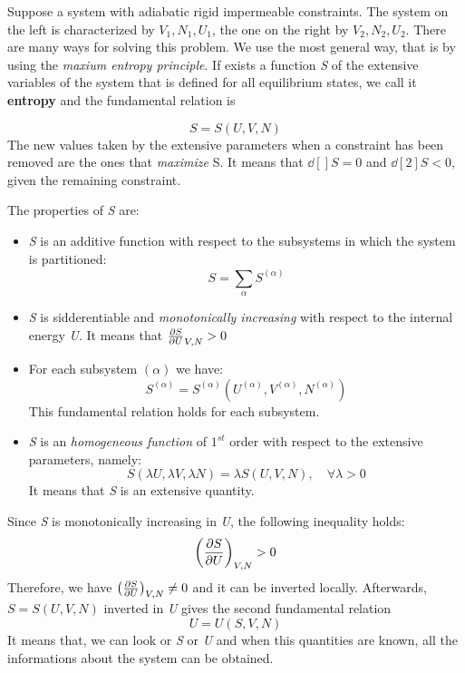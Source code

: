 \documentclass[../main/main.tex]{subfiles}
\begin{document}
Suppose a system with adiabatic rigid impermeable constraints. The system on the left is characterized by \( V_1,N_1,U_1 \), the one on the right by \( V_2,N_2,U_2 \). There are many ways for solving this problem.
We use the most general way, that is by using the \textit{maxium entropy principle}.
If exists a function \emph{S} of the extensive variables of the system that is defined for all equilibrium states, we call it \textbf{entropy} and the fundamental relation is

\begin{equation}
  S = S (U,V,N)
  \label{eq:}
\end{equation}
The new values taken by the extensive parameters when a constraint has been removed are the ones that \emph{maximize} S. It means that \( \dd[]{S} = 0 \) and \( \dd[2]{S} < 0  \), given the remaining constraint.

The properties of \emph{S} are:
\begin{itemize}
\item \emph{S} is an additive function with respect to the subsystems in which the system is partitioned:
\begin{equation}
  S = \sum_{\alpha }^{} S ^{(\alpha )}
  \label{eq:}
\end{equation}
\item \emph{S} is sidderentiable and \emph{monotonically increasing} with respect to the internal energy \emph{U}. It means that \( \pdv{S}{U}_{V,N} > 0 \)
\item For each subsystem \( (\alpha ) \) we have:
\begin{equation}
  S ^{(\alpha )} = S ^{(\alpha) } ( U ^{(\alpha) }, V ^{(\alpha) }, N ^{(\alpha) }   )
  \label{eq:}
\end{equation}
This fundamental relation holds for each subsystem.
\item \emph{S} is an \emph{homogeneous function} of \( 1^{st} \) order with respect to the extensive parameters, namely:
\begin{equation}
  S ( \lambda  U, \lambda V, \lambda N) = \lambda S (U,V,N), \quad \forall \lambda > 0
  \label{eq:}
\end{equation}
It means that \emph{S} is an extensive quantity.
\end{itemize}

Since \emph{S} is monotonically increasing in \emph{U}, the following inequality holds:
\begin{equation}
  \qty(\pdv{S}{U})_{V,N} > 0
  \label{eq:}
\end{equation}
Therefore, we have \( \qty(\pdv{S}{U})_{V,N} \neq 0 \) and it can be inverted locally. Afterwards, \( S=S(U,V,N) \) inverted in \emph{U} gives the second fundamental relation
\begin{equation}
  U=U(S,V,N)
  \label{eq:}
\end{equation}
It means that, we can look or \emph{S} or \emph{U} and when this quantities are known, all the informations about the system can be obtained.
\end{document}
